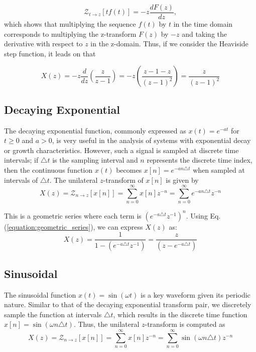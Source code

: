\documentclass[a4paper]{report}
\begin{document}
\begin{equation}
\mathcal{Z}_{t \rightarrow z}[tf(t)] = -z \frac{dF(z)}{dz},
\end{equation}
which shows that multiplying the sequence $f(t)$ by $t$ in the time domain corresponds to multiplying the z-transform $F(z)$ by $-z$ and taking the derivative with respect to $z$ in the z-domain. Thus, if we consider the Heaviside step function, it leads on that 

\begin{equation}
X(z) = -z \frac{d}{dz} \left( \frac{z}{z-1} \right) = -z \left( \frac{z - 1 - z}{(z-1)^2} \right) = \frac{z}{(z-1)^2}
\end{equation}

\subsection{Decaying Exponential}\label{section:decaying_exp}
The decaying exponential function, commonly expressed as $x(t) = e^{-at}$ for $t \geq 0$ and $a > 0$, is very useful in the analysis of systems with exponential decay or growth characteristics. However, such a signal is sampled at discrete time intervals; if $\triangle t$ is the sampling interval and $n$ represents the discrete time index, then the continuous function $x(t)$ becomes $x[n] = e^{-an\triangle t}$ when sampled at intervals of $\triangle t$. The unilateral $z$-transform of $x[n]$ is given by
\begin{equation}
	X(z) = 	\mathcal{Z}_{n \rightarrow z}[x[n]] = \sum^{\infty}_{n = 0}x[n]z^{-n} = \sum^{\infty}_{n=0} e^{-an\triangle t}z^{-n}
\end{equation}

This is a geometric series where each term is $(e^{-a\triangle t}z^{-1})^n$. Using Eq. (\ref{equation:geometric_series}), we can express $X(z)$ as:
\begin{equation}
X(z) = \frac{1}{1 - (e^{-a\triangle t}z^{-1})}= \frac{z}{(z-e^{-a\triangle t})}
\end{equation}

\subsection{Sinusoidal}\label{section:sinusoidal}
The sinusoidal function $x(t) = \sin(\omega t)$ is a key waveform given its periodic nature. Similar to that of the decaying exponential transform pair, we discretely sample the function at intervals $\triangle t$, which results in the discrete time function $x[n] = \sin(\omega n \triangle t)$. Thus, the unilateral $z$-transform is computed as
\begin{equation}
X(z) = \mathcal{Z}_{n \rightarrow z}[x[n]] = \sum^{\infty}_{n = 0}x[n]z^{-n} = \sum^{\infty}_{n = 0} \sin(\omega n \triangle t)z^{-n}
\end{equation}
\end{document}
